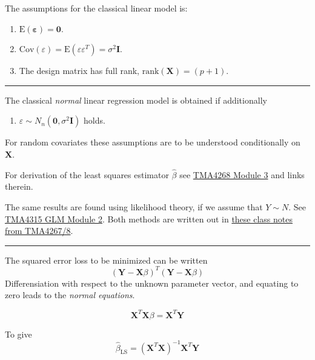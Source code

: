 \documentclass[
  letterpaper,
  DIV=11,
  numbers=noendperiod]{scrartcl}
\providecommand{\tightlist}{%
  \setlength{\itemsep}{0pt}\setlength{\parskip}{0pt}}\usepackage{longtable,booktabs,array}
\begin{document}
The assumptions for the classical linear model is:

\begin{enumerate}
\def\labelenumi{\arabic{enumi}.}
\item
  \(\text{E}(\boldsymbol{\varepsilon})=\mathbf{0}\).
\item
  \(\text{Cov}(\varepsilon)=\text{E}(\varepsilon \varepsilon^T)=\sigma^2\mathbf{I}\).
\item
  The design matrix has full rank, \(\text{rank}({\mathbf X})=(p+1)\).
\end{enumerate}

\begin{center}\rule{0.5\linewidth}{0.5pt}\end{center}

The classical \emph{normal} linear regression model is obtained if
additionally

\begin{enumerate}
\def\labelenumi{\arabic{enumi}.}
\setcounter{enumi}{3}
\tightlist
\item
  \(\varepsilon\sim N_n(\mathbf{0},\sigma^2\mathbf{I})\) holds.
\end{enumerate}

For random covariates these assumptions are to be understood
conditionally on \(\mathbf{X}\).

For derivation of the least squares estimator \(\hat{\beta}\) see
\href{https://www.math.ntnu.no/emner/TMA4268/2019v/3LinReg/3LinReg.html\#parameter_estimation}{TMA4268
Module 3} and links therein.

The same results are found using likelihood theory, if we assume that
\(Y\sim N\). See
\href{https://www.math.ntnu.no/emner/TMA4315/2018h/2MLR.html\#likelihood_theory_(from_b4)}{TMA4315
GLM Module 2}. Both methods are written out in
\href{https://www.math.ntnu.no/emner/TMA4268/2018v/notes/LeastSquaresMLR.pdf}{these
class notes from TMA4267/8}.

\begin{center}\rule{0.5\linewidth}{0.5pt}\end{center}

The squared error loss to be minimized can be written
\[({\mathbf Y}-{\mathbf X}{{\beta}})^T({\mathbf Y}-{\mathbf X}{{\beta}})\]
Differensiation with respect to the unknown parameter vector, and
equating to zero leads to the \emph{normal equations}.

\[{\mathbf X}^T{\mathbf X}{\beta}= {\mathbf X}^T {\mathbf Y}\]

To give
\[\hat{\beta}_{\text{LS}}=({\mathbf X}^T{\mathbf X})^{-1} {\mathbf X}^T {\mathbf Y}\]
\end{document}
